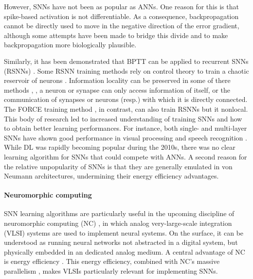 However, SNNs have not been as popular as ANNs.
One reason for this is that spike-based activation is not differentiable.
As a consequence, backpropagation cannot be directly used to move in the negative direction of the error gradient, although some attempts have been made to bridge this divide \citep{bohte2002error,hong2010cooperative,xu2013supervised,ourdighi2016efficient,lee2016training,sacramento2018dendritic,bellec2019biologically,whittington2019theories} and to make backpropagation more biologically plausible.

Similarly, it has been demonstrated that BPTT can be applied to recurrent SNNs (RSNNs) \citep{huh2017gradient,bellec2018long}.
Some RSNN training methods rely on control theory to train a chaotic reservoir of neurons \citep{thalmeier2016learning,gilra2017predicting}.
Information locality can be preserved in some of there methods \citep{alemi2018learning}, \ie, a neuron or synapse can only access information of itself, or the communication of synapses or neurons (resp.) with which it is directly connected.
The FORCE training method \citep{nicola2017supervised}, in contrast, can also train RSNNs but it nonlocal.
This body of research led to increased understanding of training SNNs and how to obtain better learning performances.
For instance, both single- and multi-layer SNNs have shown good performance in visual processing \citep{escobar2009action,kheradpisheh2018stdp,liu2017fast} and speech recognition \citep{tavanaei2017bio,dong2018unsupervised}.
While DL was rapidly becoming popular during the 2010s, there was no clear learning algorithm for SNNs that could compete with ANNs.
A second reason for the relative unpopularity of SNNs is that they are generally emulated in von Neumann architectures, undermining their energy efficiency advantages.

\paragraph{Neuromorphic computing}  %
SNN learning algorithms are particularly useful in the upcoming discipline of neuromorphic computing (NC) \citep{mitra2008real}, in which analog very-large-scale integration (VLSI) systems are used to implement neural systems.
On the surface, it can be understood as running neural networks not abstracted in a digital system, but physically embedded in an dedicated analog medium.
A central advantage of NC is energy efficiency \citep{hasler1990vlsi,lee1990parallel,tarassenko1990real}.
This energy efficiency, combined with NC's massive parallelism \citep{monroe2014neuromorphic}, makes VLSIs particularly relevant for implementing SNNs.

